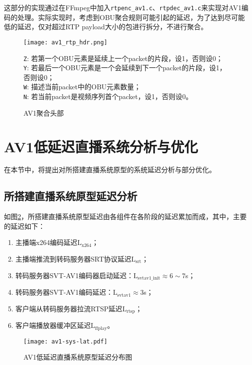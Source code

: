 	这部分的实现通过在FFmpeg中加入\texttt{rtpenc\_av1.c}、\texttt{rtpdec\_av1.c}来实现对AV1编码的处理。实际实现时，考虑到OBU聚合规则可能引起的延迟，为了达到尽可能低的延迟，仅对超过RTP payload大小的包进行拆分，不进行聚合。

	\begin{figure}[!htp]
		\centering
		\texttt{[image: av1\_rtp\_hdr.png]} \\
		\raggedright
		\footnotesize\qquad\qquad\texttt{Z}: 若第一个OBU元素是延续上一个packet的片段，设1，否则设0；\\
		\qquad\qquad\texttt{Y}: 若最后一个OBU元素是一个会延续到下一个packet的片段，设1，否则设0；\\
		\qquad\qquad\texttt{W}: 描述当前packet中的OBU元素数量；\\
		\qquad\qquad\texttt{N}: 若当前packet是视频序列首个packet，设1，否则设0。\\
		\caption{AV1聚合头部}
		\label{fig:av1rtp-aggr}
	\end{figure}
\section{AV1低延迟直播系统分析与优化}

在本节中，将提出对所搭建直播系统原型的系统延迟分析与部分优化。

\subsection{所搭建直播系统原型延迟分析}
	如图\ref{fig:av1-sys-lat}，所搭建直播系统原型延迟由各组件在各阶段的延迟累加而成，其中，主要的延迟如下：
	\begin{enumerate} [label=\arabic*)]
		\item 主播端x264编码延迟$\mathrm{L_{x264}}$；
		\item 主播端推流到转码服务器SRT协议延迟$\mathrm{L_{srt}}$；
		\item 转码服务器SVT-AV1编码器启动延迟：$\mathrm{L_{svtav1\_init}}\approx6\sim 7$s；
		\item 转码服务器SVT-AV1编码延迟：$\mathrm{L_{svtav1}}\approx 3$s；
		\item 客户端从转码服务器拉流RTSP延迟$\mathrm{L_{rtsp}}$；
		\item 客户端播放器缓冲区延迟$\mathrm{L_{ffplay}}$。
	\end{enumerate}

  \begin{figure}[!htp]
		\centering
		\texttt{[image: av1-sys-lat.pdf]}
		\caption{AV1低延迟直播系统原型延迟分布图}
		\label{fig:av1-sys-lat}
	\end{figure}

